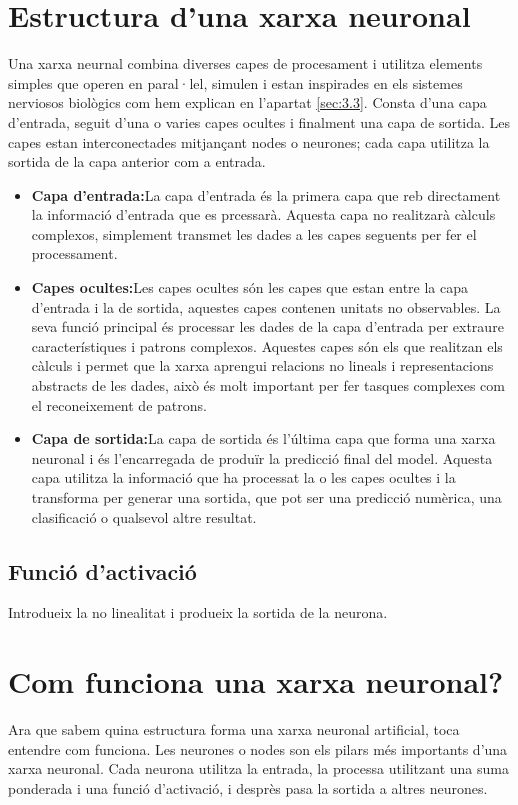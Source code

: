 \section{Estructura d'una xarxa neuronal}
Una xarxa neurnal combina diverses capes de procesament i utilitza elements simples que operen en paral·lel, simulen i estan inspirades en els sistemes nerviosos biològics com hem explican en l'apartat \ref{sec:3.3}. Consta d'una capa d'entrada, seguit d'una o varies capes ocultes i finalment una capa de sortida. Les capes estan interconectades mitjançant nodes o neurones; cada capa utilitza la sortida de la capa anterior com a entrada.
\begin{itemize}
 \item \textbf{Capa d'entrada:}La capa d'entrada és la primera capa que reb directament la informació d'entrada que es prcessarà. Aquesta capa no realitzarà càlculs complexos, simplement transmet les dades a les capes seguents per fer el processament.
 \item \textbf{Capes ocultes:}Les capes ocultes són les capes que estan entre la capa d'entrada i la de sortida, aquestes capes contenen unitats no observables. La seva funció principal és processar les dades de la capa d'entrada per extraure característiques i patrons complexos. Aquestes capes són els que realitzan els càlculs i permet que la xarxa aprengui relacions no lineals i representacions abstracts de les dades, això és molt important per fer tasques complexes com el reconeixement de patrons.
 \item \textbf{Capa de sortida:}La capa de sortida és l'última capa que forma una xarxa neuronal i és l'encarregada de produïr la predicció final del model. Aquesta capa utilitza la informació que ha processat la o les capes ocultes i la transforma per generar una sortida, que pot ser una predicció numèrica, una clasificació o qualsevol altre resultat.
\end{itemize}
\subsection{Funció d'activació}\label{sec:3.4.1}
Introdueix la no linealitat i produeix la sortida de la neurona.

\section{Com funciona una xarxa neuronal?}
Ara que sabem quina estructura forma una xarxa neuronal artificial, toca entendre com funciona. Les neurones o nodes son els pilars més importants d'una xarxa neuronal. Cada neurona utilitza la entrada, la processa utilitzant una suma ponderada i una funció d'activació, i desprès pasa la sortida a altres neurones.

